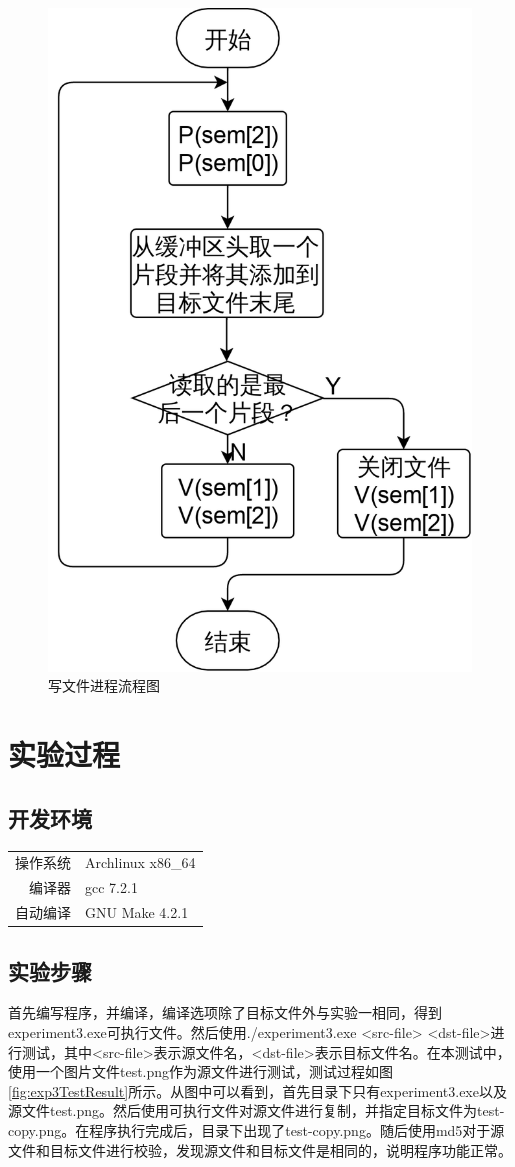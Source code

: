 \documentclass{report}
\begin{document}
\begin{figure}[ht]
    \centering
    \includegraphics[width=0.3\linewidth]{exp3Proc2Flowchart.png}
    \caption{写文件进程流程图}
    \label{fig:exp3Proc2Flowchart}
\end{figure}

\section{实验过程}
\label{sec:shi_yan_guo_cheng_3}

\subsection{开发环境}
\label{sub:kai_fa_huan_jing_3}

\begin{tabular}{r l}
    操作系统 & Archlinux x86\_64 \\
    编译器 & gcc 7.2.1 \\
    自动编译 & GNU Make 4.2.1 \\
\end{tabular}

\subsection{实验步骤}
\label{sub:shi_yan_bu_zou_3}
首先编写程序，并编译，编译选项除了目标文件外与实验一相同，得到experiment3.exe可执行文件。然后使用./experiment3.exe <src-file> <dst-file>进行测试，其中<src-file>表示源文件名，<dst-file>表示目标文件名。在本测试中，使用一个图片文件test.png作为源文件进行测试，测试过程如图\ref{fig:exp3TestResult}所示。从图中可以看到，首先目录下只有experiment3.exe以及源文件test.png。然后使用可执行文件对源文件进行复制，并指定目标文件为test-copy.png。在程序执行完成后，目录下出现了test-copy.png。随后使用md5对于源文件和目标文件进行校验，发现源文件和目标文件是相同的，说明程序功能正常。
\end{document}
